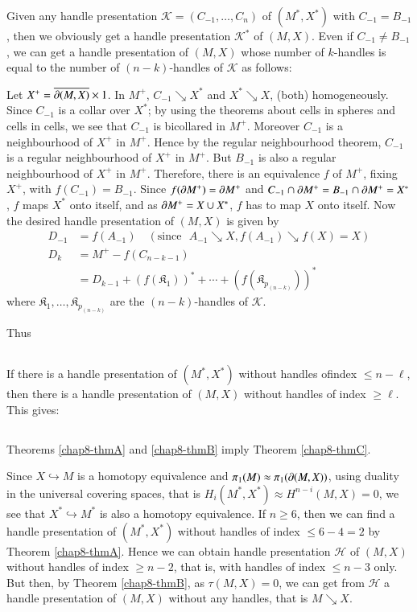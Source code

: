 Given any handle presentation $\mathscr{K}=(C_{-1},\ldots,C_{n})$ of $(M^{*},X^{*})$ with $C_{-1}=B_{-1}$, then we obviously get a handle presentation $\mathscr{K}^{*}$ of $(M,X)$. Even if $C_{-1}\neq B_{-1}$, we can get a handle presentation of $(M,X)$ whose number of $k$-handles is equal to the number of $(n-k)$-handles of $\mathscr{K}$ as follows:

Let $X^{+}=\overline{\partial(M,X)}\times 1$. In $M^{+}$, $C_{-1}\searrow X^{*}$ and $X^{*}\searrow X$, (both) homogeneously. Since $C_{-1}$ is a collar over $X^{*}$; by using the theorems about cells in spheres and cells in cells, we see that $C_{-1}$ is bicollared in $M^{+}$. Moreover $C_{-1}$ is a neighbourhood of $X^{+}$ in $M^{+}$. Hence by the regular neighbourhood theorem, $C_{-1}$ is a regular neighbourhood of $X^{+}$ in $M^{+}$. But $B_{-1}$ is also a regular neighbourhood of $X^{+}$ in $M^{+}$. Therefore, there is an equivalence $f$ of $M^{+}$, fixing $X^{+}$, 
with $f(C_{-1})=B_{-1}$. Since $f(\partial M^{+})=\partial M^{+}$ and $C_{-1}\cap \partial M^{+}=B_{-1}\cap\partial M^{+}=X^{*}$, $f$ maps $X^{*}$ onto itself, and as $\partial M^{+}=X\cup X^{*}$, $f$ has to map $X$ onto itself. Now the desired handle presentation of $(M,X)$ is given by
\begin{align*}
D_{-1} &= f(A_{-1})\quad(\text{since~ } A_{-1}\searrow X, f(A_{-1})\searrow f(X)=X)\\
D_{k} &= M^{+}-f(C_{n-k-1})\\
&= D_{k-1}+(f(\mathfrak{K}_{1}))^{*}+\cdots +(f(\mathfrak{K}_{p_{(n-k)}}))^{*}
\end{align*}
where $\mathfrak{K}_{1},\ldots,\mathfrak{K}_{p_{(n-k)}}$ are the $(n-k)$-handles of $\mathscr{K}$.

Thus

\subsection{}\label{chap8-sec8.8.1}
If there is a handle presentation of $(M^{*},X^{*})$ without handles of\pageoriginale index $\leq n-\ell$, then there is a handle presentation of $(M,X)$ without handles of index $\geq \ell$. This gives:

\subsection{}\label{chap8-sec8.8.2}
Theorems \ref{chap8-thmA} and \ref{chap8-thmB} imply Theorem \ref{chap8-thmC}.

Since $X\hookrightarrow M$ is a homotopy equivalence and $\pi_{1}(M)\approx \pi_{1}(\partial(M,X))$, using duality in the universal covering spaces, that is $H_{i}(M^{*},X^{*})\approx H^{n-i}(M,X)=0$, we see that $X^{*}\hookrightarrow M^{*}$ is also a homotopy equivalence. If $n\geq 6$, then we can find a handle presentation of $(M^{*},X^{*})$ without handles of index $\leq 6-4=2$ by Theorem \ref{chap8-thmA}. Hence we can obtain handle presentation $\mathscr{H}$ of $(M,X)$ without handles of index $\geq n-2$, that is, with handles of index $\leq n-3$ only. But then, by Theorem \ref{chap8-thmB}, as $\tau(M,X)=0$, we can get from $\mathscr{H}$ a handle presentation of $(M,X)$ without any handles, that is $M\searrow X$.

